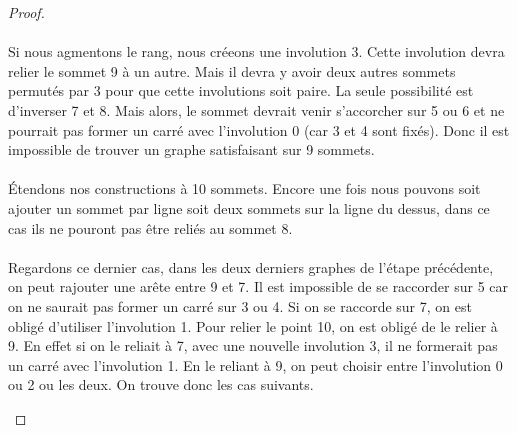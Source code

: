 \documentclass[a4paper]{article}
\theoremstyle{mytheorem}
\begin{document}
\begin{proof}
  \paragraph{}
  Si nous agmentons le rang, nous créeons une involution 3. Cette involution devra relier le sommet 9 à un autre. Mais il devra y avoir deux autres sommets permutés par 3 pour que cette involutions soit paire. La seule possibilité est d'inverser 7 et 8. Mais alors, le sommet devrait venir s'accorcher sur 5 ou 6 et ne pourrait pas former un carré avec l'involution 0 (car 3 et 4 sont fixés). Donc il est impossible de trouver un graphe satisfaisant sur 9 sommets.

  \paragraph{}
  Étendons nos constructions à 10 sommets. Encore une fois nous pouvons soit ajouter un sommet par ligne soit deux sommets sur la ligne du dessus, dans ce cas ils ne pouront pas être reliés au sommet 8.

  \paragraph{}
  Regardons ce dernier cas, dans les deux derniers graphes de l'étape précédente, on peut rajouter une arête entre 9 et 7. Il est impossible de se raccorder sur 5 car on ne saurait pas former un carré sur 3 ou 4. Si on se raccorde sur 7, on est obligé d'utiliser l'involution 1. Pour relier le point 10, on est obligé de le relier à 9. En effet si on le reliait à 7, avec une nouvelle involution 3, il ne formerait pas un carré avec l'involution 1. En le reliant à 9, on peut choisir entre l'involution 0 ou 2 ou les deux. On trouve donc les cas suivants.

  \begin{center}
\end{center}
\end{proof}
\end{document}
